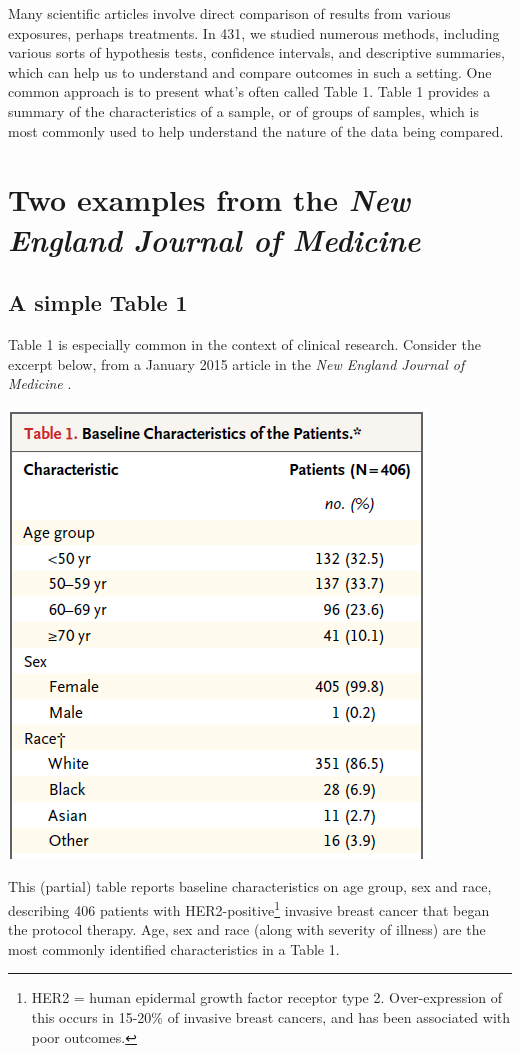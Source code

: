 \documentclass[]{book}
\let\rmarkdownfootnote\footnote%
\def\footnote{\protect\rmarkdownfootnote}
\theoremstyle{definition}
\theoremstyle{definition}
\theoremstyle{definition}
\theoremstyle{remark}
\begin{document}
Many scientific articles involve direct comparison of results from
various exposures, perhaps treatments. In 431, we studied numerous
methods, including various sorts of hypothesis tests, confidence
intervals, and descriptive summaries, which can help us to understand
and compare outcomes in such a setting. One common approach is to
present what's often called Table 1. Table 1 provides a summary of the
characteristics of a sample, or of groups of samples, which is most
commonly used to help understand the nature of the data being compared.

\section{\texorpdfstring{Two examples from the \emph{New England Journal
of
Medicine}}{Two examples from the New England Journal of Medicine}}\label{two-examples-from-the-new-england-journal-of-medicine}

\subsection{A simple Table 1}\label{a-simple-table-1}

Table 1 is especially common in the context of clinical research.
Consider the excerpt below, from a January 2015 article in the \emph{New
England Journal of Medicine} \citep{Tolaney2015}.

\includegraphics[width=0.5\linewidth]{images/Tolaney-snip1}

This (partial) table reports baseline characteristics on age group, sex
and race, describing 406 patients with HER2-positive\footnote{HER2 =
  human epidermal growth factor receptor type 2. Over-expression of this
  occurs in 15-20\% of invasive breast cancers, and has been associated
  with poor outcomes.} invasive breast cancer that began the protocol
therapy. Age, sex and race (along with severity of illness) are the most
commonly identified characteristics in a Table 1.
\end{document}
